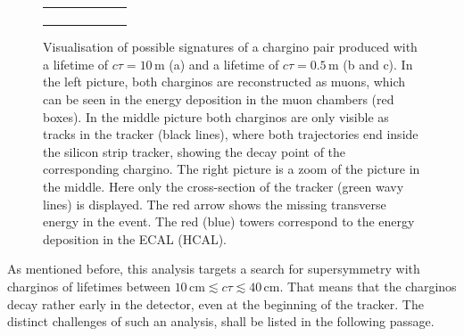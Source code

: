 \begin{figure}[!t]
\begin{tabular}{c}
\begin{subfigure}{0.31\textwidth}
      \caption{}
  \end{subfigure} 
  \end{tabular}
  \caption{Visualisation of possible signatures of a chargino pair produced with a lifetime of $c\tau = 10\,\text{m}$ (a) and a lifetime of $c\tau = 0.5\,\text{m}$ (b and c). 
           In the left picture, both charginos are reconstructed as muons, which can be seen in the energy deposition in the muon chambers (red boxes). 
           In the middle picture both charginos are only visible as tracks in the tracker (black lines), where both trajectories end inside the silicon strip tracker, showing the decay point of the corresponding chargino. 
           The right picture is a zoom of the picture in the middle. Here only the cross-section of the tracker (green wavy lines) is displayed. The red arrow shows the missing transverse energy in the event.
           The red (blue) towers correspond to the energy deposition in the ECAL (HCAL).} 
  \label{fig:CharginoPaiEventDisplay}
\end{figure}

As mentioned before, this analysis targets a search for supersymmetry with charginos of lifetimes between $10\,\text{cm} \lesssim c\tau \lesssim  40\,\text{cm}$.
That means that the charginos decay rather early in the detector, even at the beginning of the tracker. 
The distinct challenges of such an analysis, shall be listed in the following passage.

